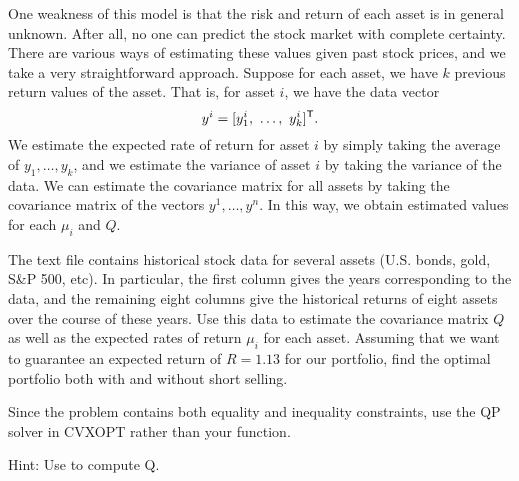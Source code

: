 One weakness of this model is that the risk and return of each asset is in general unknown.
After all, no one can predict the stock market with complete certainty.
There are various ways of estimating these values given past stock prices, and we take a very straightforward approach.
Suppose for each asset, we have $k$ previous return values of the asset. That is, for asset $i$, we have the data vector\[y^i = [y^i_1,\,\, \ldots, \,\,y^i_k]^{\mathsf T} .\]
We estimate the expected rate of return for asset $i$ by simply taking the average of $y_1,\ldots,y_k$, and we estimate the variance
of asset $i$ by taking the variance of the data.
We can estimate the covariance matrix for all assets by taking the covariance matrix of the vectors $y^1,\ldots,y^n$.
In this way, we obtain estimated values for each $\mu_i$ and $Q$.

\begin{problem}
The text file  contains historical stock data for several assets (U.S. bonds, gold, S\&P 500, etc).
In particular, the first column gives the years corresponding to the data, and the remaining eight columns give the historical returns
of eight assets over the course of these years.
Use this data to estimate the covariance matrix $Q$ as well as the expected rates of return $\mu_i$ for each asset.
Assuming that we want to guarantee an expected return of $R = 1.13$ for our portfolio, find the optimal portfolio both with and without short selling.

Since the problem contains both equality and inequality constraints, use the QP solver in CVXOPT rather than your  function.

Hint: Use  to compute Q.
\end{problem}
